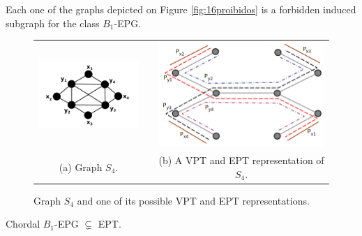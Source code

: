 \documentclass{dmgt}
\begin{document}
  \begin{cor}\label{c:prohib}
  Each one of the graphs depicted on Figure \ref{fig:16proibidos} is a forbidden induced subgraph for the class $B_1$-EPG.
  \end{cor}
  




%
\begin{figure}[htb]
  \centering
  \begin{tabular}{ c c c }
    \centering
    \includegraphics[width=5cm]{s4.png} & &
    \includegraphics[width=8cm]{s4eptRepresentation.png}
    \\
    \footnotesize \centering 
    (a)  \footnotesize Graph $S_4$. &&  \footnotesize (b) A VPT and EPT representation of $S_{4}$. \\

  \end{tabular}

 \caption{Graph $S_4$ and one of its possible VPT and EPT representations.}
 \label{fig:exemplos}
\end{figure} 



\begin{theorem}\label{teo:b1epgept}
Chordal $B_1$-EPG $\subsetneq$ EPT. 
\end{theorem}
\end{document}
